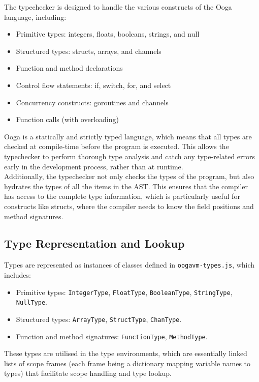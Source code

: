 \documentclass{report}
\begin{document}
The typechecker is designed to handle the various constructs of the Ooga language, including:
\begin{itemize}
    \item Primitive types: integers, floats, booleans, strings, and null
    \item Structured types: structs, arrays, and channels
    \item Function and method declarations
    \item Control flow statements: if, switch, for, and select
    \item Concurrency constructs: goroutines and channels
    \item Function calls (with overloading)
\end{itemize}

Ooga is a statically and strictly typed language, which means that all types are checked at compile-time before the program is executed. This allows the typechecker to perform thorough type analysis and catch any type-related errors early in the development process, rather than at runtime.\\

Additionally, the typechecker not only checks the types of the program, but also hydrates the types of all the items in the AST. This ensures that the compiler has access to the complete type information, which is particularly useful for constructs like structs, where the compiler needs to know the field positions and method signatures.

\subsection{Type Representation and Lookup}
Types are represented as instances of classes defined in \texttt{oogavm-types.js}, which includes:
\begin{itemize}
    \item Primitive types: \texttt{IntegerType}, \texttt{FloatType}, \texttt{BooleanType}, \texttt{StringType}, \texttt{NullType}.
    \item Structured types: \texttt{ArrayType}, \texttt{StructType}, \texttt{ChanType}.
    \item Function and method signatures: \texttt{FunctionType}, \texttt{MethodType}.
\end{itemize}

These types are utilised in the type environments, which are essentially linked lists of scope frames (each frame being a dictionary mapping variable names to types) that facilitate scope handling and type lookup.\\
\end{document}
